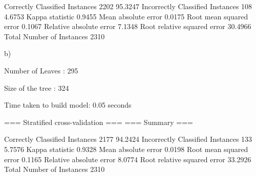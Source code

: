 Correctly Classified Instances        2202               95.3247 %
Incorrectly Classified Instances       108                4.6753 %
Kappa statistic                          0.9455
Mean absolute error                      0.0175
Root mean squared error                  0.1067
Relative absolute error                  7.1348 %
Root relative squared error             30.4966 %
Total Number of Instances             2310

b)

Number of Leaves  : 	295

Size of the tree : 	324


Time taken to build model: 0.05 seconds

=== Stratified cross-validation ===
=== Summary ===

Correctly Classified Instances        2177               94.2424 %
Incorrectly Classified Instances       133                5.7576 %
Kappa statistic                          0.9328
Mean absolute error                      0.0198
Root mean squared error                  0.1165
Relative absolute error                  8.0774 %
Root relative squared error             33.2926 %
Total Number of Instances             2310     



